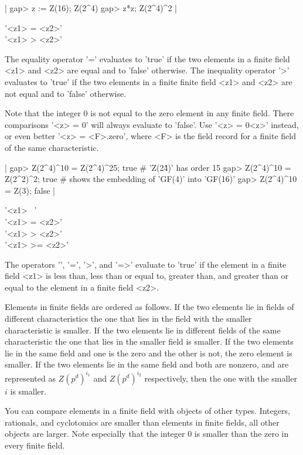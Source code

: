 |    gap> z := Z(16);
    Z(2^4)
    gap> z*z;
    Z(2^4)^2 |

%

'<z1> = <z2>'\\
'<z1> \<> <z2>'

The equality  operator  '=' evaluates to 'true'  if the two elements in a
finite  field <z1> and   <z2> are equal   and to 'false' otherwise.   The
inequality operator '\<>' evaluates to  'true' if  the two  elements in a
finite finite field <z1> and <z2> are not equal and to 'false' otherwise.

Note that the integer  0 is not equal to  the  zero element in any finite
field.  There comparisons '<z> = 0' will always evaluate to 'false'.  Use
'<z> = 0\*<z>' instead, or even better '<z> = <F>.zero', where <F> is the
field record for a finite field of the same characteristic.

|    gap> Z(2^4)^10 = Z(2^4)^25;
    true    # 'Z(2\^4)' has order 15
    gap> Z(2^4)^10 = Z(2^2)^2;
    true    # shows the embedding of 'GF(4)' into 'GF(16)'
    gap> Z(2^4)^10 = Z(3);
    false |

'<z1> \<\ <z2>'\\
'<z1> \<= <z2>'\\
'<z1>  >  <z2>'\\
'<z1>  >= <z2>'

The operators  '\<',  '\<=', '>',  and  '=>' evaluate to  'true'  if  the
element  in  a finite field <z1>  is  less  than, less than or equal  to,
greater than, and greater than or equal to the element  in a finite field
<z2>.

Elements in finite fields  are ordered as follows.   If the two  elements
lie in fields of different characteristics the one that lies in the field
with the  smaller characteristic is smaller.  If  the two elements lie in
different fields  of  the same characteristic  the  one that  lies in the
smaller field is smaller.  If the two elements lie  in the same field and
one is  the zero and the  other is not, the zero  element is smaller.  If
the  two elements lie  in  the same field and   both are nonzero, and are
represented as $Z(p^d)^{i_1}$  and $Z(p^d)^{i_2}$ respectively, then  the
one with the smaller $i$ is smaller.

You can  compare elements in a  finite field with objects of other types.
Integers, rationals, and  cyclotomics are smaller than elements in finite
fields, all other objects are larger.  Note especially that the integer 0
is smaller than the zero in every finite field.

